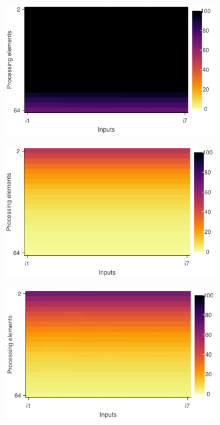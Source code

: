 \begin{figure}[H]
	\begin{subfigure}[b]{0.45\textwidth}
		\includegraphics[width=\textwidth]{pascalanalyzer/figures/results/regionscomparison_r1.pdf}
		\caption{\centering}
		\label{fig:pv_regionscomparison_a}
	\end{subfigure}
	\begin{subfigure}[b]{0.45\textwidth}
		\includegraphics[width=\textwidth]{pascalanalyzer/figures/results/regionscomparison_r2.pdf}
		\caption{\centering}
		\label{fig:pv_regionscomparison_b}
	\end{subfigure}
	\begin{subfigure}[b]{0.45\textwidth}
		\includegraphics[width=\textwidth]{pascalanalyzer/figures/results/regionscomparison_whole.pdf}

\end{subfigure}
\end{figure}
